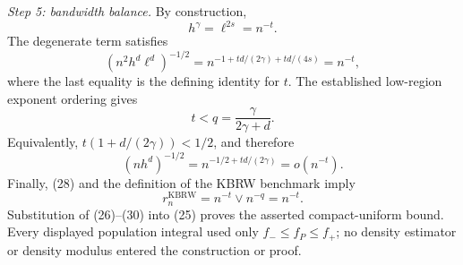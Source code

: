 \emph{Step 5: bandwidth balance.}
By construction,
\[
h^\gamma=\ell^{2s}=n^{-t}.
\tag{26}
\]
The degenerate term satisfies
\[
(n^2h^d\ell^d)^{-1/2}
=n^{-1+t d/(2\gamma)+t d/(4s)}=n^{-t},
\tag{27}
\]
where the last equality is the defining identity for \(t\).  The established
low-region exponent ordering gives
\[
t<q=\frac\gamma{2\gamma+d}.
\tag{28}
\]
Equivalently,
\(t(1+d/(2\gamma))<1/2\), and therefore
\[
(nh^d)^{-1/2}
=n^{-1/2+t d/(2\gamma)}=o(n^{-t}).
\tag{29}
\]
Finally, (28) and the definition of the KBRW benchmark imply
\[
r_n^{\mathrm{KBRW}}=n^{-t}\vee n^{-q}=n^{-t}.
\tag{30}
\]
Substitution of (26)--(30) into (25) proves the asserted compact-uniform
bound.  Every displayed population integral used only
\(f_-\leq f_P\leq f_+\); no density estimator or density modulus entered the
construction or proof.